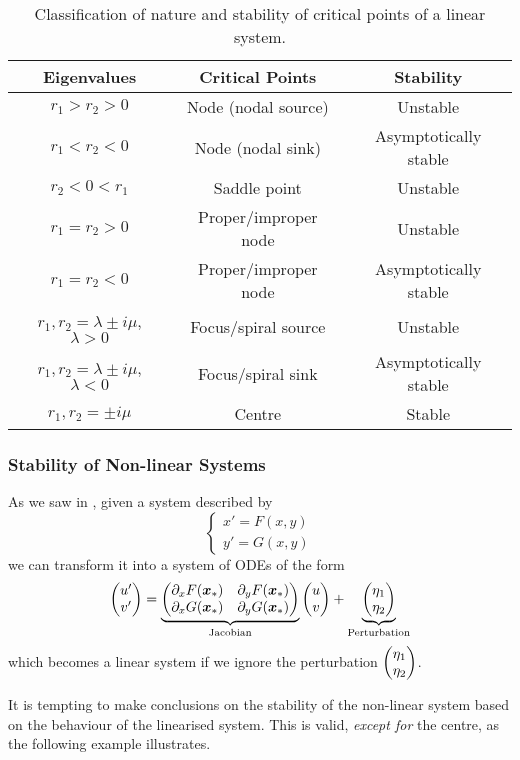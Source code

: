\begin{table}[H]
	\begin{center}
		\begin{tabular}{c|c|c}
			Eigenvalues & Critical Points & Stability \\
			\hline
			$r_1 > r_2 > 0$ & Node (nodal source) & Unstable \\
			$r_1 < r_2 < 0$ & Node (nodal sink) & Asymptotically stable \\
			$r_2 < 0 < r_1$ & Saddle point & Unstable \\
			$r_1 = r_2 > 0$ & Proper/improper node & Unstable \\
			$r_1 = r_2 < 0$ & Proper/improper node & Asymptotically stable \\
			$r_1,r_2 = \lambda \pm i\mu$, $\lambda>0$ & Focus/spiral source & Unstable \\
			$r_1,r_2 = \lambda \pm i\mu$, $\lambda<0$ & Focus/spiral sink & Asymptotically stable \\
			$r_1,r_2 = \pm i\mu$ & Centre & Stable \\
		\end{tabular}
	\end{center}
	\caption{Classification of nature and stability of critical points of a linear system.}
	\label{table:stability}
\end{table}

\subsubsection{Stability of Non-linear Systems}

As we saw in , given a system described by
\[
\begin{cases}
	x' = F(x,y) \\
	y' = G(x,y)
\end{cases}
\]
we can transform it into a system of ODEs of the form
\[
\begin{pmatrix}u'\\v'\end{pmatrix} = \underbrace{\begin{pmatrix}\partial_x F(\bm{x}_{\ast}) & \partial_y F(\bm{x}_{\ast}) \\ \partial_x G(\bm{x}_{\ast}) & \partial_y G(\bm{x}_{\ast})\end{pmatrix}}_{\text{Jacobian}} \begin{pmatrix}u\\v\end{pmatrix} + \underbrace{\begin{pmatrix}\eta_1 \\ \eta_2\end{pmatrix}}_{\text{Perturbation}}
\]
which becomes a linear system if we ignore the perturbation $\begin{pmatrix}\eta_1 \\ \eta_2\end{pmatrix}$.

It is tempting to make conclusions on the stability of the non-linear system based on the behaviour of the linearised system. This is valid, \emph{except for} the centre, as the following example illustrates.

